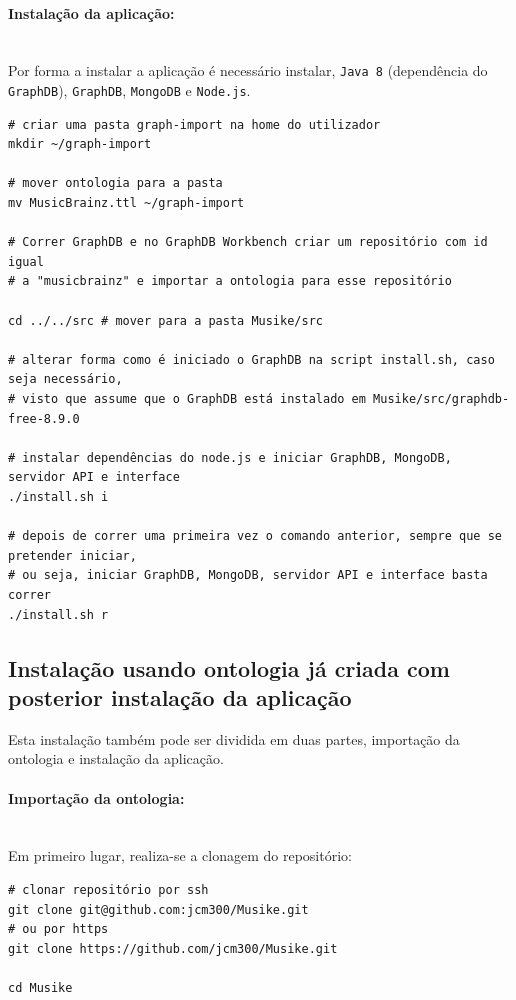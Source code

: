 \documentclass{article}
\begin{document}
\paragraph{Instalação da aplicação:}\mbox{}\\

Por forma a instalar a aplicação é necessário instalar, \texttt{Java 8} (dependência do \texttt{GraphDB}), \texttt{GraphDB}, \texttt{MongoDB} e \texttt{Node.js}.

\begin{framed}
\begin{verbatim}
# criar uma pasta graph-import na home do utilizador
mkdir ~/graph-import

# mover ontologia para a pasta
mv MusicBrainz.ttl ~/graph-import

# Correr GraphDB e no GraphDB Workbench criar um repositório com id igual 
# a "musicbrainz" e importar a ontologia para esse repositório

cd ../../src # mover para a pasta Musike/src

# alterar forma como é iniciado o GraphDB na script install.sh, caso seja necessário,
# visto que assume que o GraphDB está instalado em Musike/src/graphdb-free-8.9.0

# instalar dependências do node.js e iniciar GraphDB, MongoDB, servidor API e interface
./install.sh i

# depois de correr uma primeira vez o comando anterior, sempre que se pretender iniciar,
# ou seja, iniciar GraphDB, MongoDB, servidor API e interface basta correr
./install.sh r
\end{verbatim}
\end{framed}

\subsection{Instalação usando ontologia já criada com posterior instalação da aplicação}

Esta instalação também pode ser dividida em duas partes, importação da ontologia e instalação da aplicação.

\paragraph{Importação da ontologia:}\mbox{}\\

Em primeiro lugar, realiza-se a clonagem do repositório:

\begin{framed}
\begin{verbatim}
# clonar repositório por ssh
git clone git@github.com:jcm300/Musike.git
# ou por https
git clone https://github.com/jcm300/Musike.git

cd Musike
\end{verbatim}
\end{framed}
\end{document}
